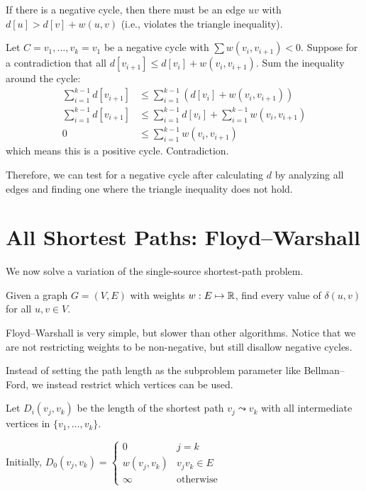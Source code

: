 \begin{prop}
  If there is a negative cycle, then there must be an edge $uv$
  with $d[u] > d[v] + w(u,v)$ (i.e., violates the triangle inequality).
\end{prop}
\begin{prf}
  Let $C = v_1,\dotsc,v_k = v_1$ be a negative cycle with $\sum w(v_i,v_{i+1}) < 0$.
  Suppose for a contradiction that all $d[v_{i+1}] \leq d[v_i] + w(v_i,v_{i+1})$.
  Sum the inequality around the cycle:
  \begin{align*}
    \sum_{i=1}^{k-1} d[v_{i+1}] & \leq \sum_{i=1}^{k-1} (d[v_i] + w(v_i,v_{i+1}))                \\
    \sum_{i=1}^{k-1} d[v_{i+1}] & \leq \sum_{i=1}^{k-1} d[v_i] + \sum_{i=1}^{k-1} w(v_i,v_{i+1}) \\
    0                           & \leq \sum_{i=1}^{k-1} w(v_i,v_{i+1})
  \end{align*}
  which means this is a positive cycle. Contradiction.
\end{prf}

Therefore, we can test for a negative cycle after calculating $d$
by analyzing all edges and finding one where the triangle inequality does not hold.

\section{All Shortest Paths: Floyd--Warshall}

We now solve a variation of the single-source shortest-path problem.

\begin{problem}
  Given a graph $G = (V, E)$ with weights $w : E \mapsto \mathbb{R}$,
  find every value of $\delta(u,v)$ for all $u, v \in V$.
\end{problem}

Floyd--Warshall is very simple, but slower than other algorithms.
Notice that we are not restricting weights to be non-negative,
but still disallow negative cycles.

Instead of setting the path length as the subproblem parameter like Bellman--Ford,
we instead restrict which vertices can be used.

Let $D_i(v_j,v_k)$ be the length of the shortest path $v_j \leadsto v_k$
with all intermediate vertices in $\{v_1,\dotsc,v_k\}$.

Initially, $D_0(v_j,v_k) = \begin{cases}
    0          & j = k            \\
    w(v_j,v_k) & v_jv_k \in E     \\
    \infty     & \text{otherwise}
  \end{cases}$

